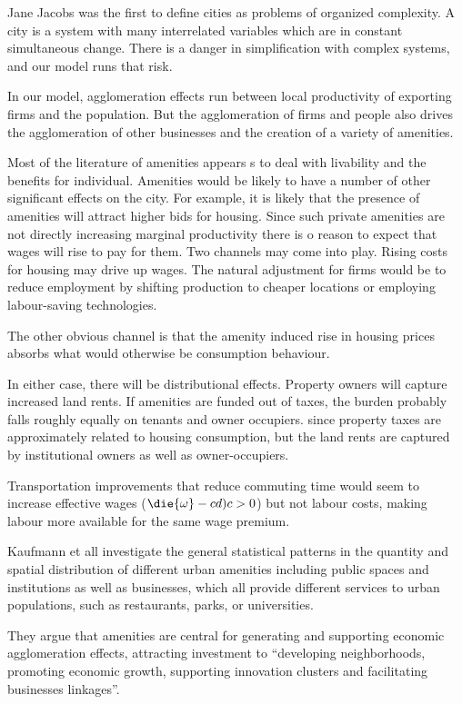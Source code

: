 


Jane Jacobs was the first to define cities as problems of organized complexity. A city is a system with many interrelated variables which are  in constant simultaneous change. 
There is a danger in simplification with complex systems, and our model runs that risk. 

In our model, agglomeration effects run between local productivity  of exporting firms and the population. But the agglomeration of firms and people also drives the agglomeration of other businesses and the creation of a variety of amenities.

Most of the literature of amenities appears s to deal with livability  and the benefits for individual. Amenities would be likely to have a number of other significant effects on the city. For example, it is likely that the presence of amenities will attract higher bids for housing. Since such private amenities are not directly increasing marginal productivity there is o reason to expect that wages will rise to pay for them. Two channels may come into play. Rising costs for housing may drive up wages. The natural adjustment for firms would be to reduce employment by shifting production to cheaper locations or  employing labour-saving technologies.

The other obvious channel is that the amenity induced rise in housing prices absorbs what would otherwise be consumption behaviour.

In either case, there will be distributional effects. Property owners will capture increased land rents. If amenities are funded out of taxes, the burden probably falls roughly equally on tenants and owner occupiers. since property taxes are approximately related to housing consumption, but the land rents are captured by institutional owners as well as owner-occupiers.

Transportation improvements that reduce commuting time would seem to increase effective wages ($\die{\omega}-cd){c}>0$) but not labour costs, making labour more available for the same wage premium. 

Kaufmann et all investigate the  general statistical patterns in the quantity and spatial distribution of different urban amenities including public spaces and institutions as well as businesses, which all provide different services to urban populations, such as  restaurants, parks, or universities. 

They argue that amenities are  central for generating and supporting economic agglomeration effects, attracting investment to ``developing neighborhoods, promoting economic growth, supporting innovation clusters and facilitating businesses linkages''. 

